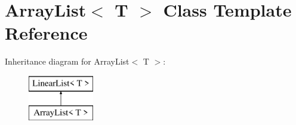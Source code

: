 \hypertarget{classArrayList}{}\section{Array\+List$<$ T $>$ Class Template Reference}
\label{classArrayList}
Inheritance diagram for Array\+List$<$ T $>$\+:\begin{figure}[H]
\begin{center}
\leavevmode
\includegraphics[height=2.000000cm]{classArrayList}
\end{center}
\end{figure}
